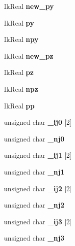 \begin{DoxyCompactItemize}
\item 
Ik\-Real {\bfseries new\-\_\-py}\label{class_i_k_solver_a92d9c8748e96823e08979ba79f215031}

\item 
Ik\-Real {\bfseries py}\label{class_i_k_solver_a997924d324efb5f12e6642cb28ee1470}

\item 
Ik\-Real {\bfseries npy}\label{class_i_k_solver_ab79bcd5d003ba38f5c1926e35446d123}

\item 
Ik\-Real {\bfseries new\-\_\-pz}\label{class_i_k_solver_a298e74662237a8df2869e8ad8ec2d00e}

\item 
Ik\-Real {\bfseries pz}\label{class_i_k_solver_a34d107aa2bd31deda5da19b9c191f183}

\item 
Ik\-Real {\bfseries npz}\label{class_i_k_solver_ac5ba601bbc95efd9881f70ebf871c5c1}

\item 
Ik\-Real {\bfseries pp}\label{class_i_k_solver_a2940190f4bac7e2fcd3d95503beb1a29}

\item 
unsigned char {\bfseries \-\_\-ij0} [2]\label{class_i_k_solver_ae0fdf96e14e42d408bc5e16580c81100}

\item 
unsigned char {\bfseries \-\_\-nj0}\label{class_i_k_solver_ac2fb0a00657f58a0bc49485454ddd914}

\item 
unsigned char {\bfseries \-\_\-ij1} [2]\label{class_i_k_solver_a66a0610cba0da00e09deda3c72e3909f}

\item 
unsigned char {\bfseries \-\_\-nj1}\label{class_i_k_solver_a38f5fb04f76ea095f6835eb767de1bbb}

\item 
unsigned char {\bfseries \-\_\-ij2} [2]\label{class_i_k_solver_aff0b7815729d44c5decbef316763d45f}

\item 
unsigned char {\bfseries \-\_\-nj2}\label{class_i_k_solver_aac13220157c526f065b9f655b4a5cb7f}

\item 
unsigned char {\bfseries \-\_\-ij3} [2]\label{class_i_k_solver_a4e65e7d6f429bdc4ad9146bda1b48712}

\item 
unsigned char {\bfseries \-\_\-nj3}\label{class_i_k_solver_a19d64b2e1f7c33b7492420d74ff280a0}


\end{DoxyCompactItemize}
